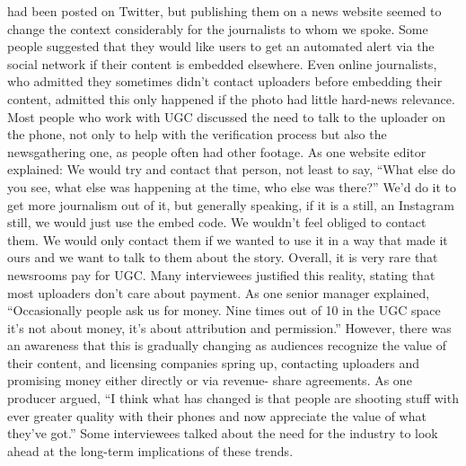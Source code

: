 \documentclass[symmetric, notoc, nobib]{towcenter-book}
\begin{document}
had been posted on Twitter, but publishing them on a news website seemed
to change the context considerably for the journalists to whom we spoke.
Some people suggested that they would like users to get an automated alert
via the social network if their content is embedded elsewhere.
Even online journalists, who admitted they sometimes didn't contact
uploaders before embedding their content, admitted this only happened
if the photo had little hard-news relevance. Most people who work with
UGC discussed the need to talk to the uploader on the phone, not only to
help with the verification process but also the newsgathering one, as people
often had other footage. As one website editor explained:
We would try and contact that person, not least to say, ``What else do
you see, what else was happening at the time, who else was there?''
We'd do it to get more journalism out of it, but generally speaking, if
it is a still, an Instagram still, we would just use the embed code. We
wouldn't feel obliged to contact them. We would only contact them
if we wanted to use it in a way that made it ours and we want to talk
to them about the story.
Overall, it is very rare that newsrooms pay for UGC. Many interviewees justified
this reality, stating that most uploaders don't care about payment. As
one senior manager explained, ``Occasionally people ask us for money. Nine
times out of 10 in the UGC space it's not about money, it's about attribution
and permission.''
However, there was an awareness that this is gradually changing as audiences
recognize the value of their content, and licensing companies spring
up, contacting uploaders and promising money either directly or via revenue-
share agreements. As one producer argued, ``I think what has changed
is that people are shooting stuff with ever greater quality with their phones
and now appreciate the value of what they've got.'' Some interviewees talked
about the need for the industry to look ahead at the long-term implications
of these trends.
\end{document}
